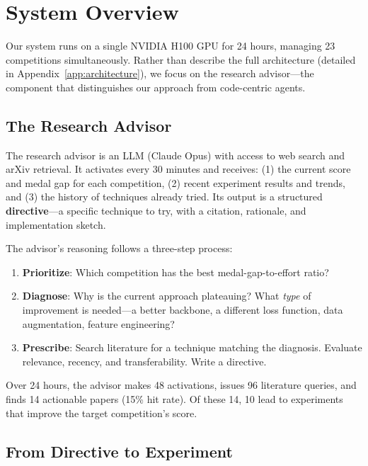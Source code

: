 \documentclass{article}
\begin{document}
\section{System Overview}
\label{sec:system}

Our system runs on a single NVIDIA H100 GPU for 24 hours, managing 23 competitions simultaneously. Rather than describe the full architecture (detailed in Appendix~\ref{app:architecture}), we focus on the research advisor---the component that distinguishes our approach from code-centric agents.

\subsection{The Research Advisor}
\label{sec:advisor}

The research advisor is an LLM (Claude Opus) with access to web search and arXiv retrieval. It activates every 30 minutes and receives: (1) the current score and medal gap for each competition, (2) recent experiment results and trends, and (3) the history of techniques already tried. Its output is a structured \textbf{directive}---a specific technique to try, with a citation, rationale, and implementation sketch.

The advisor's reasoning follows a three-step process:
\begin{enumerate}[leftmargin=1.5em,itemsep=1pt]
    \item \textbf{Prioritize}: Which competition has the best medal-gap-to-effort ratio?
    \item \textbf{Diagnose}: Why is the current approach plateauing? What \emph{type} of improvement is needed---a better backbone, a different loss function, data augmentation, feature engineering?
    \item \textbf{Prescribe}: Search literature for a technique matching the diagnosis. Evaluate relevance, recency, and transferability. Write a directive.
\end{enumerate}

Over 24 hours, the advisor makes 48 activations, issues 96 literature queries, and finds 14 actionable papers (15\% hit rate). Of these 14, 10 lead to experiments that improve the target competition's score.

\subsection{From Directive to Experiment}
\label{sec:pipeline}
\end{document}
